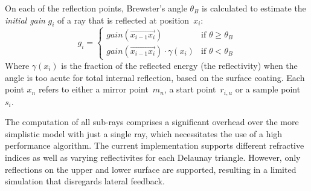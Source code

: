 On each of the reflection points, Brewster's angle $\theta_{B}$ is calculated to
estimate the \emph{initial gain} $g_i$ of a ray that is reflected at position~$x_i$:
\begin{equation}
\label{eq:gain_reflection}
  g_i = 
  \begin{cases}
    gain(\overrightarrow{x_{i-1}x_i}) & \text{if } \theta \ge \theta_{B}  \\
    gain(\overrightarrow{x_{i-1}x_i}) \cdot \gamma(x_i) & \text{if } \theta < \theta_{B}   
  \end{cases}
\end{equation}
Where $\gamma(x_i)$ is the fraction of the reflected energy (the
reflectivity) when the angle is too acute for total internal
reflection, based on the surface coating. Each point $x_n$ refers to
either a mirror point~$m_n$, a start point~$r_{i,u}$ or a sample point~$s_i$.

The computation of all sub-rays comprises a significant overhead over the more
simplistic model with just a single ray, which necessitates the use of a high
performance algorithm.  The current implementation supports different refractive
indices as well as varying reflectivites for each Delaunay triangle. However,
only reflections on the upper and lower surface are supported, resulting in a
limited simulation that disregards lateral feedback. 
